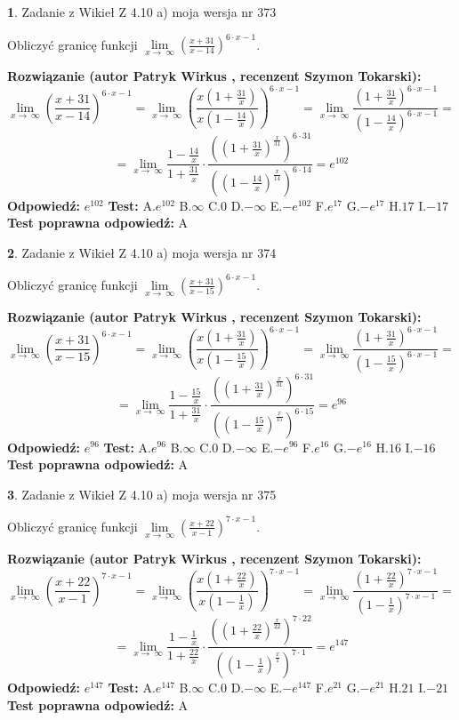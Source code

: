 \documentclass[12pt, a4paper]{article}
\theoremstyle{definition} %
\newtheorem{zad}{}
\newcommand{\zadStart}[1]{\begin{zad}#1\newline}
\newcommand{\zadStop}{\end{zad}}
\newcommand{\rozwStart}[2]{\noindent \textbf{Rozwiązanie (autor #1 , recenzent #2): }\newline}
\newcommand{\rozwStop}{\newline}
\newcommand{\odpStart}{\noindent \textbf{Odpowiedź:}\newline}
\newcommand{\odpStop}{\newline}
\newcommand{\testStart}{\noindent \textbf{Test:}\newline}
\newcommand{\testStop}{\newline}
\newcommand{\kluczStart}{\noindent \textbf{Test poprawna odpowiedź:}\newline}
\newcommand{\kluczStop}{\newline}
\begin{document}
\zadStart{Zadanie z Wikieł Z 4.10 a) moja wersja nr 373}

Obliczyć granicę funkcji  $\lim\limits_{x\to\ \infty}(\frac{x+31}{x-14})^{6\cdot x-1}$.
\zadStop
\rozwStart{Patryk Wirkus}{Szymon Tokarski}
$$\lim\limits_{x\to\ \infty}(\frac{x+31}{x-14})^{6\cdot x-1} = \lim\limits_{x\to\ \infty}(\frac{x(1+\frac{31}{x})}{x(1-\frac{14}{x})})^{6\cdot x-1}=\lim\limits_{x\to\ \infty}\frac{(1+\frac{31}{x})^{6\cdot x-1}}{(1-\frac{14}{x})^{6\cdot x-1}}=$$
$$=\lim\limits_{x\to\ \infty}\frac{1-\frac{14}{x}}{1+\frac{31}{x}}\cdot\frac{((1+\frac{31}{x})^{\frac{x}{31}})^{6\cdot31}}{((1-\frac{14}{x})^{\frac{x}{14}})^{6\cdot14}}=e^{102}$$
\rozwStop
\odpStart
$e^{102}$
\odpStop
\testStart
A.$e^{102}$ B.$\infty$ C.$0$ D.$-\infty$ E.$-e^{102}$
F.$e^{17}$ G.$-e^{17}$
H.$17$
I.$-17$
\testStop
\kluczStart
A
\kluczStop



\zadStart{Zadanie z Wikieł Z 4.10 a) moja wersja nr 374}

Obliczyć granicę funkcji  $\lim\limits_{x\to\ \infty}(\frac{x+31}{x-15})^{6\cdot x-1}$.
\zadStop
\rozwStart{Patryk Wirkus}{Szymon Tokarski}
$$\lim\limits_{x\to\ \infty}(\frac{x+31}{x-15})^{6\cdot x-1} = \lim\limits_{x\to\ \infty}(\frac{x(1+\frac{31}{x})}{x(1-\frac{15}{x})})^{6\cdot x-1}=\lim\limits_{x\to\ \infty}\frac{(1+\frac{31}{x})^{6\cdot x-1}}{(1-\frac{15}{x})^{6\cdot x-1}}=$$
$$=\lim\limits_{x\to\ \infty}\frac{1-\frac{15}{x}}{1+\frac{31}{x}}\cdot\frac{((1+\frac{31}{x})^{\frac{x}{31}})^{6\cdot31}}{((1-\frac{15}{x})^{\frac{x}{15}})^{6\cdot15}}=e^{96}$$
\rozwStop
\odpStart
$e^{96}$
\odpStop
\testStart
A.$e^{96}$ B.$\infty$ C.$0$ D.$-\infty$ E.$-e^{96}$
F.$e^{16}$ G.$-e^{16}$
H.$16$
I.$-16$
\testStop
\kluczStart
A
\kluczStop



\zadStart{Zadanie z Wikieł Z 4.10 a) moja wersja nr 375}

Obliczyć granicę funkcji  $\lim\limits_{x\to\ \infty}(\frac{x+22}{x-1})^{7\cdot x-1}$.
\zadStop
\rozwStart{Patryk Wirkus}{Szymon Tokarski}
$$\lim\limits_{x\to\ \infty}(\frac{x+22}{x-1})^{7\cdot x-1} = \lim\limits_{x\to\ \infty}(\frac{x(1+\frac{22}{x})}{x(1-\frac{1}{x})})^{7\cdot x-1}=\lim\limits_{x\to\ \infty}\frac{(1+\frac{22}{x})^{7\cdot x-1}}{(1-\frac{1}{x})^{7\cdot x-1}}=$$
$$=\lim\limits_{x\to\ \infty}\frac{1-\frac{1}{x}}{1+\frac{22}{x}}\cdot\frac{((1+\frac{22}{x})^{\frac{x}{22}})^{7\cdot22}}{((1-\frac{1}{x})^{\frac{x}{1}})^{7\cdot1}}=e^{147}$$
\rozwStop
\odpStart
$e^{147}$
\odpStop
\testStart
A.$e^{147}$ B.$\infty$ C.$0$ D.$-\infty$ E.$-e^{147}$
F.$e^{21}$ G.$-e^{21}$
H.$21$
I.$-21$
\testStop
\kluczStart
A
\kluczStop
\end{document}
